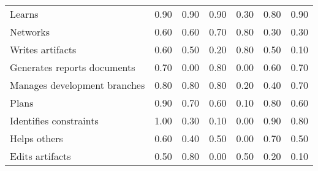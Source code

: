 \begin{tabular}{lrrrrrr}
Learns & 0.90 & 0.90 & 0.90 & 0.30 & 0.80 & 0.90 \\
Networks & 0.60 & 0.60 & 0.70 & 0.80 & 0.30 & 0.30 \\
Writes artifacts & 0.60 & 0.50 & 0.20 & 0.80 & 0.50 & 0.10 \\
Generates reports documents & 0.70 & 0.00 & 0.80 & 0.00 & 0.60 & 0.70 \\
Manages development branches & 0.80 & 0.80 & 0.80 & 0.20 & 0.40 & 0.70 \\
Plans & 0.90 & 0.70 & 0.60 & 0.10 & 0.80 & 0.60 \\
Identifies constraints & 1.00 & 0.30 & 0.10 & 0.00 & 0.90 & 0.80 \\
Helps others & 0.60 & 0.40 & 0.50 & 0.00 & 0.70 & 0.50 \\
Edits artifacts & 0.50 & 0.80 & 0.00 & 0.50 & 0.20 & 0.10 \\
\bottomrule
\end{tabular}
